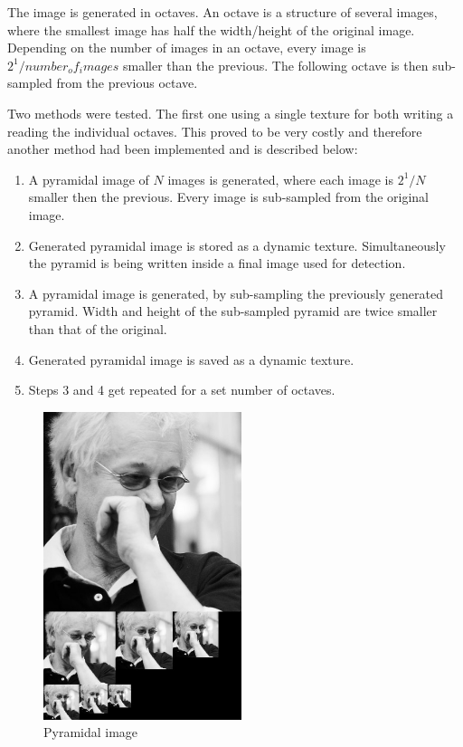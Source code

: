 The image is generated in octaves. An octave is a structure of several images, where the smallest image has half the width/height of the original image. Depending on the number of images in an octave, every image is $2^1/number_of_images$ smaller than the previous. The following octave is then sub-sampled from the previous octave.

Two methods were tested. The first one using a single texture for both writing a reading the individual octaves. This proved to be very costly and therefore another method had been implemented and is described below:

\begin{enumerate}
	\item A pyramidal image of $N$ images is generated, where each image is $2^1/N$ smaller then the previous. Every image is sub-sampled from the original image.
	\item Generated pyramidal image is stored as a dynamic texture. Simultaneously the pyramid is being written inside a final image used for detection.
	\item A pyramidal image is generated, by sub-sampling the previously generated pyramid. Width and height of the sub-sampled pyramid are twice smaller than that of the original.
	\item Generated pyramidal image is saved as a dynamic texture.
	\item Steps 3 and 4 get repeated for a set number of octaves.
\end{enumerate}

\begin{center}
\begin{figure}[h]
	\centering\includegraphics[height=9cm]{fig/pyramid.jpg}
	\caption{Pyramidal image}
\end{figure}
\end{center}

